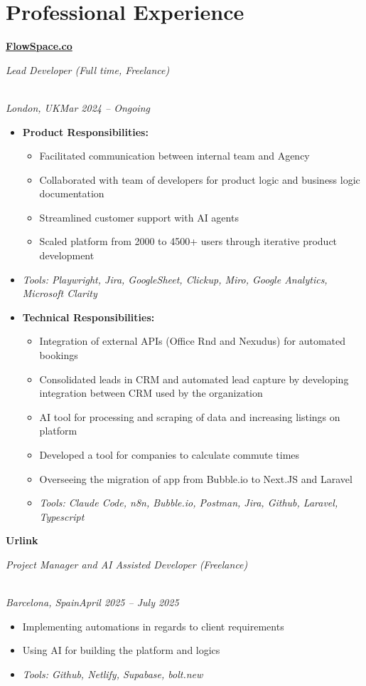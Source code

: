 \documentclass[a4paper,10pt]{article}
\newcommand{\role}[4]{\vspace{3pt}\noindent\hspace{0.6em}\parbox[t]{0.38\textwidth}{\raggedright\textbf{#1}}\hfill\parbox[t]{0.58\textwidth}{\raggedleft\textit{#2}}\\{\textit{#3}\hfill\textit{#4}}\vspace{1pt}}
\begin{document}
\section{Professional Experience}
\role{\href{https://flowspace.co}{FlowSpace.co}}{Lead Developer (Full time, Freelance)}{London, UK}{Mar 2024 -- Ongoing}
\begin{itemize}
\item \textbf{Product Responsibilities:}
\begin{itemize}[label=--]
\item Facilitated communication between internal team and Agency
\item Collaborated with team of developers for product logic and business logic documentation
\item Streamlined customer support with AI agents
\item Scaled platform from 2000 to 4500+ users through iterative product development
\end{itemize}
\item \textit{Tools: Playwright, Jira, GoogleSheet, Clickup, Miro, Google Analytics, Microsoft Clarity}
\item \textbf{Technical Responsibilities:}
\begin{itemize}[label=--]
\item Integration of external APIs (Office Rnd and Nexudus) for automated bookings
\item Consolidated leads in CRM and automated lead capture by developing integration between CRM used by the organization
\item AI tool for processing and scraping of data and increasing listings on platform
\item Developed a tool for companies to calculate commute times
\item Overseeing the migration of app from Bubble.io to Next.JS and Laravel
\item \textit{Tools: Claude Code, n8n, Bubble.io, Postman, Jira, Github, Laravel, Typescript}
\end{itemize}
\end{itemize}

\role{Urlink}{Project Manager and AI Assisted Developer (Freelance)}{Barcelona, Spain}{April 2025 -- July 2025}
\begin{itemize}
\item Implementing automations in regards to client requirements
\item Using AI for building the platform and logics
\item \textit{Tools: Github, Netlify, Supabase, bolt.new}
\end{itemize}
\end{document}
